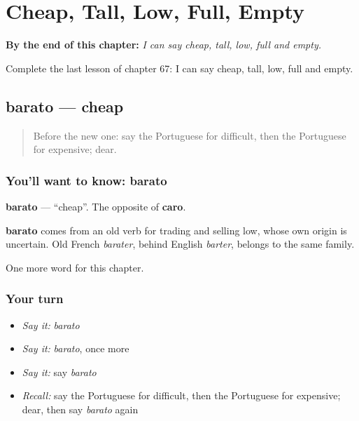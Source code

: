 
\chapter{Cheap, Tall, Low, Full, Empty}
\label{ch:pt-cheap-tall-low-full-empty}

\begin{chapteropening}
\textbf{By the end of this chapter:} \emph{I can say cheap, tall, low, full and empty.}

Complete the last lesson of chapter 67: I can say cheap, tall, low, full and empty.
\end{chapteropening}

\section[barato]{barato — cheap}

\label{lesson:PT-C67-barato}



\begin{quote}
Before the new one: say the Portuguese for difficult, then the Portuguese for expensive; dear.
\end{quote}

\subsection*{You'll want to know: barato}
\textbf{barato} — \textquotedblleft{}cheap\textquotedblright{}. The opposite of \textbf{caro}.

\begin{cousinweb}
\textbf{barato} comes from an old verb for trading and selling low, whose own origin is uncertain. Old French \emph{barater}, behind English \emph{barter}, belongs to the same family.
\end{cousinweb}

\begin{grammarlens}[title={What you've built}]
One more word for this chapter.
\end{grammarlens}

\subsection*{Your turn}
\begin{itemize}
\raggedright
  \item \emph{Say it:} \emph{barato}
  \item \emph{Say it:} \emph{barato}, once more
  \item \emph{Say it:} say \emph{barato}
  \item \emph{Recall:} say the Portuguese for difficult, then the Portuguese for expensive; dear, then say \emph{barato} again
\end{itemize}

